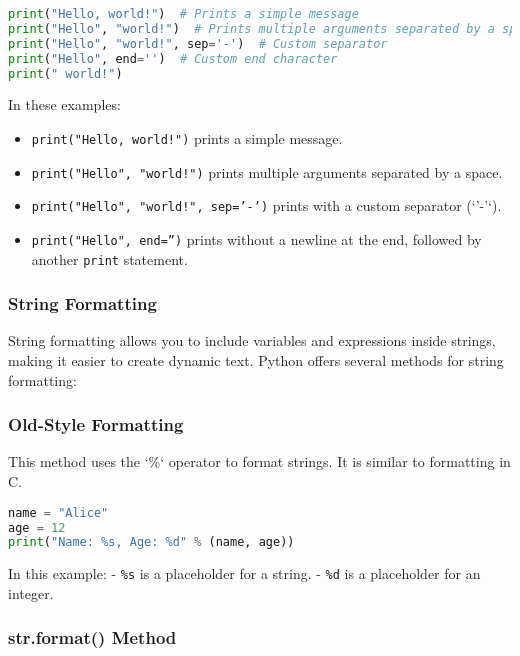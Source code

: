 \begin{lstlisting}[language=Python, caption=Basic \texttt{print} Function Example]
print("Hello, world!")  # Prints a simple message
print("Hello", "world!")  # Prints multiple arguments separated by a space
print("Hello", "world!", sep='-')  # Custom separator
print("Hello", end='')  # Custom end character
print(" world!")
\end{lstlisting}

In these examples:
\begin{itemize}
    \item \texttt{print("Hello, world!")} prints a simple message.
    \item \texttt{print("Hello", "world!")} prints multiple arguments separated by a space.
    \item \texttt{print("Hello", "world!", sep='-')} prints with a custom separator (`'-'`).
    \item \texttt{print("Hello", end='')} prints without a newline at the end, followed by another \texttt{print} statement.
\end{itemize}

\subsubsection{String Formatting}

String formatting allows you to include variables and expressions inside strings, making it easier to create dynamic text. Python offers several methods for string formatting:

\subsubsection{Old-Style Formatting}

This method uses the `\%` operator to format strings. It is similar to formatting in C.

\begin{lstlisting}[language=Python, caption=Old-Style String Formatting Example]
name = "Alice"
age = 12
print("Name: %s, Age: %d" % (name, age))
\end{lstlisting}

In this example:
- \texttt{\%s} is a placeholder for a string.
- \texttt{\%d} is a placeholder for an integer.

\subsubsection{str.format() Method}

